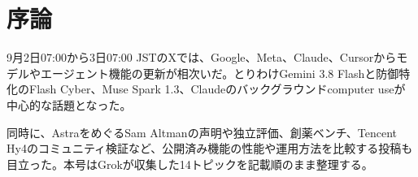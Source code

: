 \section*{序論}
9月2日07:00から3日07:00 JSTのXでは、Google、Meta、Claude、Cursorからモデルやエージェント機能の更新が相次いだ。とりわけGemini 3.8 Flashと防御特化のFlash Cyber、Muse Spark 1.3、Claudeのバックグラウンドcomputer useが中心的な話題となった。

同時に、AstraをめぐるSam Altmanの声明や独立評価、創薬ベンチ、Tencent Hy4のコミュニティ検証など、公開済み機能の性能や運用方法を比較する投稿も目立った。本号はGrokが収集した14トピックを記載順のまま整理する。
